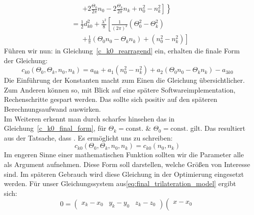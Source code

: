 {\begin{align}
    &\phantom{=}\;
   	\left.\left.+2\frac{\Theta_0}{2\pi}n_0-2\frac{\Theta_k}{2\pi}n_k+n_0^2-n_k^2\right]\right\}\\
%	
	&=\frac{1}{2}d_{k0}^2+\frac{\lambda^2}{8}\left[\frac{1}{(2\pi)^2}\left(\Theta_0^2-\Theta_k^2\right) \right.\nonumber\\
	&\phantom{=}\;
	\left. +\frac{1}{\pi}\left(\Theta_0n_0-\Theta_kn_k\right)+\left(n_0^2-n_k^2\right)\right]\label{c_k0_rearragend}
\end{align}
%
Führen wir nun:
%
in Gleichung~\eqref{c_k0_rearragend} ein, erhalten die finale Form der Gleichung:
\begin{equation}
c_{k0}(\Theta_0, \Theta_k, n_0, n_k) = a_{0k}+a_1(n_0^2-n_k^2)+a_2(\Theta_0n_0-\Theta_kn_k)-a_{3k0}\label{c_k0_final_form}   
\end{equation}
%
Die Einführung der Konstanten macht zum Einen die Gleichung übersichtlicher. Zum Anderen können so, mit Blick auf eine spätere Softwareimplementation, Rechenschritte gespart werden. Das sollte sich positiv auf den späteren Berechnungsaufwand auswirken.\\
%
Im Weiteren erkennt man durch scharfes hinsehen das in Gleichung~\eqref{c_k0_final_form}, für $\Theta_k=\text{const.}$ \& $\Theta_0=\text{const.}$ gilt. Das resultiert aus der Tatsache, dass . Es ermöglicht uns zu schreiben:
\begin{equation}
c_{k0}(\Theta_0, \Theta_k, n_0, n_k) = c_{k0}(n_0, n_k)
\end{equation}
%
Im engeren Sinne einer mathematischen Funktion sollten wir die Parameter alle als Argument aufnehmen. Diese Form soll darstellen, welche Größen von Interesse sind. Im späteren Gebrauch wird diese Gleichung in der Optimierung eingesetzt werden.
Für unser Gleichungssystem aus\eqref{eq:final_trilateration_model} ergibt sich:
\begin{equation}\label{eq:wavenumber_trilateration_model}
0=
\left(
	\begin{array}{ccc}
		x_k-x_0 & y_k-y_0 & z_k-z_0 
	\end{array}
\right)
\left(
   \begin{array}{c}
	   x-x_0\\

\end{array}
\end{equation}}

